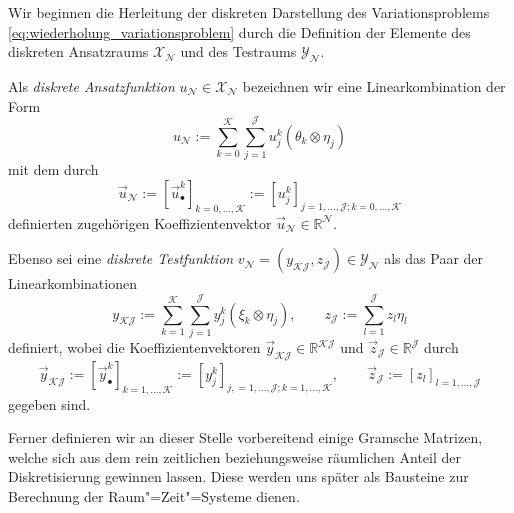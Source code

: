 \documentclass[../main.tex]{subfiles}
\begin{document}
Wir beginnen die Herleitung der diskreten Darstellung des Variationsproblems \cref{eq:wiederholung_variationsproblem} durch die Definition der Elemente des diskreten Ansatzraums $\mathcal X_{\mathcal N}$ und des Testraums $\mathcal Y_{\mathcal N}$.

\begin{Definition}
\label{definition:diskrete_ansatz_und_testfunktionen}
    Als \emph{diskrete Ansatzfunktion} $u_{\mathcal N} \in \mathcal X_{\mathcal N}$ bezeichnen wir eine Linearkombination der Form
    \begin{equation}
    \label{eq:darstellung_diskrete_ansatzfunktion}
        u_{\mathcal N} := \sum_{k = 0}^{\mathcal K} \sum_{j = 1}^{\mathcal J} u_{j}^{k} (\theta_{k} \otimes \eta_{j})
    \end{equation}
    mit dem durch
    \begin{equation}
        \vec{u}_{\mathcal N} := [\vec{u}^{k}_{\bullet}]_{k = 0, \dots, \mathcal K} := [ u^{k}_{j} ]_{j = 1, \dots, \mathcal J;k = 0, \dots, \mathcal K}
    \end{equation}
    definierten zugehörigen Koeffizientenvektor $\vec{u}_{\mathcal N} \in \mathbb{R}^{\mathcal N}$.

    Ebenso sei eine \emph{diskrete Testfunktion} $v_{\mathcal N} = (y_{\mathcal K \mathcal J}, z_{\mathcal J}) \in \mathcal Y_{\mathcal N}$ als das Paar der Linearkombinationen
    \begin{equation}
    \label{eq:darstellung_diskrete_testfunktion}
        y_{\mathcal K \mathcal J} := \sum_{k = 1}^{\mathcal K} \sum_{j = 1}^{\mathcal J} y_{j}^{k} (\xi_{k} \otimes \eta_{j}), \qquad
        z_{\mathcal J} := \sum_{l = 1}^{\mathcal J} z_{l} \eta_{l}
    \end{equation}
    definiert,
    wobei die Koeffizientenvektoren $\vec{y}_{\mathcal K \mathcal J} \in \mathbb{R}^{\mathcal K \mathcal J}$ und $\vec{z}_{\mathcal J} \in \mathbb{R}^{\mathcal J}$ durch
    \begin{equation}
        \vec{y}_{\mathcal K \mathcal J} := [\vec{y}^{k}_{\bullet}]_{k = 1, \dots, \mathcal K} := [y^{k}_{j}]_{j, = 1, \dots, \mathcal J; k = 1, \dots, \mathcal K}, \qquad
        \vec{z}_{\mathcal J} := [z_{l}]_{l = 1, \dots, \mathcal J}
    \end{equation}
    gegeben sind.
\end{Definition}

Ferner definieren wir an dieser Stelle vorbereitend einige Gramsche Matrizen, welche sich aus dem rein zeitlichen beziehungsweise räumlichen Anteil der Diskretisierung gewinnen lassen.
Diese werden uns später als Bausteine zur Berechnung der Raum"=Zeit"=Systeme dienen.
\end{document}
